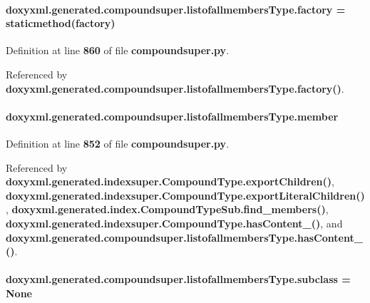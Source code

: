 \paragraph[{factory}]{\setlength{\rightskip}{0pt plus 5cm}doxyxml.\+generated.\+compoundsuper.\+listofallmembers\+Type.\+factory = staticmethod(factory)\hspace{0.3cm}{\ttfamily [static]}}\label{classdoxyxml_1_1generated_1_1compoundsuper_1_1listofallmembersType_af0891f5077be7d76f456ef10d1ec41b0}


Definition at line {\bf 860} of file {\bf compoundsuper.\+py}.



Referenced by {\bf doxyxml.\+generated.\+compoundsuper.\+listofallmembers\+Type.\+factory()}.

\paragraph[{member}]{\setlength{\rightskip}{0pt plus 5cm}doxyxml.\+generated.\+compoundsuper.\+listofallmembers\+Type.\+member}\label{classdoxyxml_1_1generated_1_1compoundsuper_1_1listofallmembersType_afb46d57a79a3fcbe0dac10eaa378dff5}


Definition at line {\bf 852} of file {\bf compoundsuper.\+py}.



Referenced by {\bf doxyxml.\+generated.\+indexsuper.\+Compound\+Type.\+export\+Children()}, {\bf doxyxml.\+generated.\+indexsuper.\+Compound\+Type.\+export\+Literal\+Children()}, {\bf doxyxml.\+generated.\+index.\+Compound\+Type\+Sub.\+find\+\_\+members()}, {\bf doxyxml.\+generated.\+indexsuper.\+Compound\+Type.\+has\+Content\+\_\+()}, and {\bf doxyxml.\+generated.\+compoundsuper.\+listofallmembers\+Type.\+has\+Content\+\_\+()}.

\paragraph[{subclass}]{\setlength{\rightskip}{0pt plus 5cm}doxyxml.\+generated.\+compoundsuper.\+listofallmembers\+Type.\+subclass = None\hspace{0.3cm}{\ttfamily [static]}}\label{classdoxyxml_1_1generated_1_1compoundsuper_1_1listofallmembersType_a42ad500153060359e5be76c49c2a944b}


